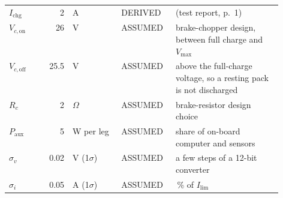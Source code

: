 {\begin{tabular}{>{\raggedright\arraybackslash}p{0.14\linewidth}rll>{\raggedright\arraybackslash}p{0.39\linewidth}}
$I_{\mathrm{chg}}$ & 2 & A & DERIVED & \cite{kollmeyer2020hg2} (test report, p.~1) \\
$V_{c,\mathrm{on}}$ & 26 & V & ASSUMED & brake-chopper design, between full charge and $V_{\max}$ \\
$V_{c,\mathrm{off}}$ & 25.5 & V & ASSUMED & above the full-charge voltage, so a resting pack is not discharged \\
$R_c$ & 2 & $\Omega$ & ASSUMED & brake-resistor design choice \\
$P_{\mathrm{aux}}$ & 5 & W per leg & ASSUMED & share of on-board computer and sensors \\
$\sigma_v$ & 0.02 & V (1$\sigma$) & ASSUMED & a few steps of a 12-bit converter \\
$\sigma_i$ & 0.05 & A (1$\sigma$) & ASSUMED & 0.5\,\% of $I_{\lim}$ \\
\bottomrule\end{tabular}}
